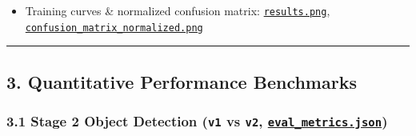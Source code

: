 \documentclass[10.5pt,a4paper]{article}
\begin{document}
\begin{itemize}[leftmargin=1.5em,itemsep=2pt]
\item Training curves \& normalized confusion matrix: \href{https://github.com/Heisnotanimposter/Totalcare\_autonomous\_driving\_Yolov5/blob/main/results/v2\_improved/outputs/train\_results/results.png}{\texttt{results.\allowbreak{}png}}, \href{https://github.com/Heisnotanimposter/Totalcare\_autonomous\_driving\_Yolov5/blob/main/results/v2\_improved/outputs/train\_results/confusion\_matrix\_normalized.png}{\texttt{confusion\_\allowbreak{}matrix\_\allowbreak{}normalized.\allowbreak{}png}}
\end{itemize}

\par\noindent\rule{\textwidth}{0.4pt}\par\medskip

\subsection{3. Quantitative Performance Benchmarks}

\subsubsection{3.1 Stage 2 Object Detection (\texttt{v1} vs \texttt{v2}, \href{https://github.com/Heisnotanimposter/Totalcare\_autonomous\_driving\_Yolov5/blob/main/results/v2\_improved/outputs/eval\_metrics.json}{\texttt{eval\_\allowbreak{}metrics.\allowbreak{}json}})}
\end{document}

